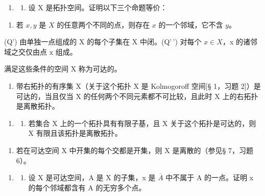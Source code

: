 \BourbakiExerciseGroup

\begin{enumerate}
\def\labelenumi{\arabic{enumi})}
\tightlist
\item
  \begin{enumerate}
  \def\labelenumii{\alph{enumii})}
  \tightlist
  \item
    设 X 是拓扑空间。证明以下三个命题等价：
  \end{enumerate}
\end{enumerate}

\begin{enumerate}
\def\labelenumi{(\Alph{enumi})}
\setcounter{enumi}{16}
\tightlist
\item
  若 \(x, y\) 是 \(X\) 的任意两个不同的点，则存在 \(x\) 的一个邻域，它不含 \(y\)。
\end{enumerate}

(Q') 由单独一点组成的 X 的每个子集在 X 中闭。(Q'\,') 对每个 \(x \in X\)，x 的诸邻域之交仅由点 x 组成。

满足这些条件的空间 X 称为可达的。

\begin{enumerate}
\def\labelenumi{\alph{enumi})}
\setcounter{enumi}{1}
\tightlist
\item
  带右拓扑的有序集 X（关于这个拓扑 X 是 Kolmogoroff 空间{[}§ 1，习题 2{]}）是可达的，当且仅当 X 的任何两个不同元素都不可比较，且此时 X 上的右拓扑是离散拓扑。
\end{enumerate}

\begin{enumerate}
\def\labelenumi{\arabic{enumi})}
\setcounter{enumi}{1}
\tightlist
\item
  \begin{enumerate}
  \def\labelenumii{\alph{enumii})}
  \tightlist
  \item
    若集合 X 上的一个拓扑具有有限子基，且 X 关于这个拓扑是可达的，则 X 有限且该拓扑是离散拓扑。
  \end{enumerate}
\end{enumerate}

\begin{enumerate}
\def\labelenumi{\alph{enumi})}
\setcounter{enumi}{1}
\tightlist
\item
  若在可达空间 X 中开集的每个交都是开集，则 X 是离散的（参见§ 7，习题 6）。
\end{enumerate}

\begin{enumerate}
\def\labelenumi{\arabic{enumi})}
\setcounter{enumi}{2}
\tightlist
\item
  \begin{enumerate}
  \def\labelenumii{\alph{enumii})}
  \tightlist
  \item
    设 X 是可达空间，A 是 X 的子集，x 是 \(\overline{A}\) 中不属于 A 的一点。证明 x 的每个邻域都含有 A 的无穷多个点。
  \end{enumerate}
\end{enumerate}

